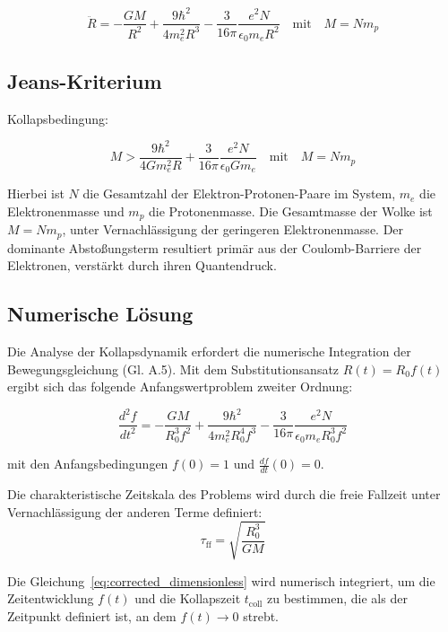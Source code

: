\begin{equation}
    \ddot{R} = -\frac{G M}{R^2} + \frac{9 \hbar^2}{4 m_e^2 R^3} - \frac{3}{16\pi} \frac{e^2 N}{\epsilon_0 m_e R^2}
    \quad \text{mit} \quad M = N m_p
\end{equation}

\subsection{Jeans-Kriterium}
Kollapsbedingung:

\begin{equation}
    M > \frac{9 \hbar^2}{4 G m_e^2 R} + \frac{3}{16\pi} \frac{e^2 N}{\epsilon_0 G m_e}
    \quad \text{mit} \quad M = N m_p
\end{equation}

Hierbei ist $N$ die Gesamtzahl der Elektron-Protonen-Paare im System, $m_e$ die Elektronenmasse und $m_p$ die Protonenmasse. Die Gesamtmasse der Wolke ist $M = N m_p$, unter Vernachlässigung
der geringeren Elektronenmasse. Der dominante Abstoßungsterm resultiert primär aus der Coulomb-Barriere der Elektronen, verstärkt durch ihren Quantendruck.

\subsection{Numerische Lösung}
Die Analyse der Kollapsdynamik erfordert die numerische Integration der Bewegungsgleichung (Gl. A.5). Mit dem Substitutionsansatz $R(t) = R_0 f(t)$ ergibt sich das folgende
Anfangswertproblem zweiter Ordnung:

\begin{equation}
\label{eq:corrected_dimensionless}
\frac{d^{2}f}{dt^{2}} = -\frac{G M}{R_{0}^{3} f^{2}} + \frac{9 \hbar^{2}}{4 m_e^{2} R_{0}^{4} f^{3}} - \frac{3}{16\pi} \frac{e^{2} N}{\epsilon_{0} m_e R_{0}^{3} f^{2}}
\end{equation}

\noindent mit den Anfangsbedingungen $f(0) = 1$ und $\frac{df}{dt}(0) = 0$.

Die charakteristische Zeitskala des Problems wird durch die freie Fallzeit unter Vernachlässigung der anderen Terme definiert:
\[
\tau_{\text{ff}} = \sqrt{\frac{R_0^3}{G M}}
\]

Die Gleichung~\ref{eq:corrected_dimensionless} wird numerisch integriert, um die Zeitentwicklung $f(t)$ und die Kollapszeit $t_{\text{coll}}$ zu bestimmen, die als der Zeitpunkt definiert ist,
an dem $f(t) \rightarrow 0$ strebt.

